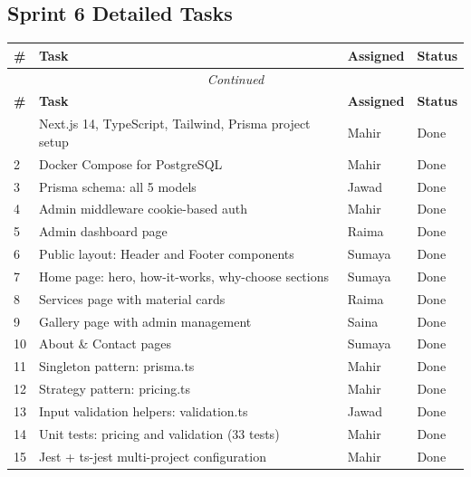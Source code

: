 \documentclass[12pt, a4paper]{article}
\begin{document}
\subsection{Sprint 6 Detailed Tasks}

\begin{longtable}{p{0.5cm}p{6.5cm}p{2cm}p{1.5cm}}
\toprule
\textbf{\#} & \textbf{Task} & \textbf{Assigned} & \textbf{Status} \\
\midrule
\endfirsthead
\multicolumn{4}{c}{\textit{Continued}}\\
\toprule
\textbf{\#} & \textbf{Task} & \textbf{Assigned} & \textbf{Status} \\
\midrule
\endhead
\bottomrule
\endlastfoot
1  & Next.js 14, TypeScript, Tailwind, Prisma project setup & Mahir & Done \\
2  & Docker Compose for PostgreSQL                           & Mahir & Done \\
3  & Prisma schema: all 5 models                             & Jawad & Done \\
4  & Admin middleware cookie-based auth                      & Mahir & Done \\
5  & Admin dashboard page                                    & Raima & Done \\
6  & Public layout: Header and Footer components               & Sumaya & Done \\
7  & Home page: hero, how-it-works, why-choose sections         & Sumaya & Done \\
8  & Services page with material cards                         & Raima & Done \\
9  & Gallery page with admin management                        & Saina & Done \\
10 & About \& Contact pages                                  & Sumaya & Done \\
11 & Singleton pattern: prisma.ts                              & Mahir & Done \\
12 & Strategy pattern: pricing.ts                              & Mahir & Done \\
13 & Input validation helpers: validation.ts                   & Jawad & Done \\
14 & Unit tests: pricing and validation (33 tests)              & Mahir & Done \\
15 & Jest + ts-jest multi-project configuration                & Mahir & Done \\
\end{longtable}
\end{document}
